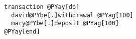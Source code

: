 \begin{Verbatim}[commandchars=@\[\]]
transaction @PYay[do]
  david@PYbe[.]withdrawal @PYag[100]
  mary@PYbe[.]deposit @PYag[100]
@PYay[end]
\end{Verbatim}
